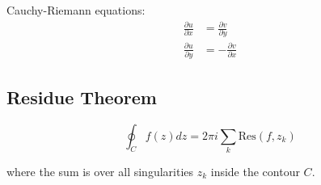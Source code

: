 \documentclass[11pt]{article}
\begin{document}
Cauchy-Riemann equations:
\begin{align}
\frac{\partial u}{\partial x} &= \frac{\partial v}{\partial y} \\
\frac{\partial u}{\partial y} &= -\frac{\partial v}{\partial x}
\end{align}

\subsection{Residue Theorem}
\begin{equation}
\oint_C f(z) dz = 2\pi i \sum_{k} \text{Res}(f, z_k)
\end{equation}

where the sum is over all singularities $z_k$ inside the contour $C$.
\end{document}

